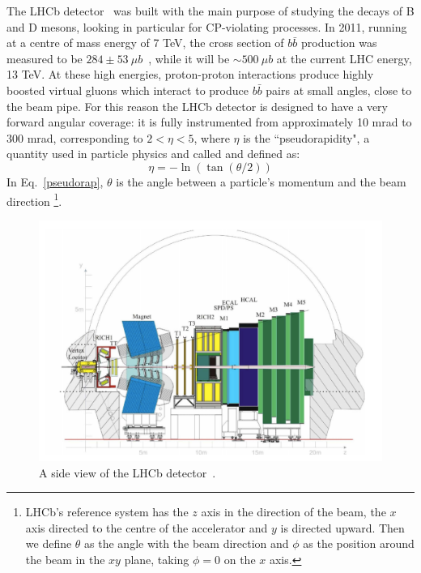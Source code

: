 The LHCb detector~\cite{Alves:2008zz} was built with the main purpose of studying the decays of B and D mesons, looking in particular for
CP-violating processes. In 2011, running at a centre of mass energy of 7 TeV, the cross section of $b\bar{b}$ production
was measured to be $284 \pm 53 ~\mu b$~\cite{Aaij:2010gn}, while it will be $\sim500 ~\mu b$ at the current LHC energy, 13 TeV.
At these high energies, proton-proton interactions produce highly boosted virtual gluons which interact to produce $b\bar{b}$
pairs at small angles, close to the beam pipe. For this reason the LHCb detector is designed to have a very forward angular
coverage: it is fully instrumented from approximately 10 mrad to 300 mrad, corresponding to $2 < \eta < 5$, where $\eta$
is the ``pseudorapidity", a quantity used in particle physics and called and defined as:
\begin{equation}
\label{pseudorap}
\eta = - \ln(\tan(\theta/2))
\end{equation}
In Eq.~\ref{pseudorap}, $\theta$ is the angle between a particle's momentum and the beam direction
\footnote{LHCb's reference system has the $z$ axis in the direction of the beam, the $x$ axis directed to
the centre of the accelerator and $y$ is directed upward. Then we define $\theta$ as the angle with the beam
direction and $\phi$ as the position around the beam in the $xy$ plane, taking $\phi = 0$ on the $x$ axis.}.

\begin{figure}[h]
\label{lhcb}
\includegraphics[width=0.95\linewidth]{Detector/figs/LHCb_official.png}
\caption{A side view of the LHCb detector~\cite{Alves:2008zz}.}
\end{figure}

